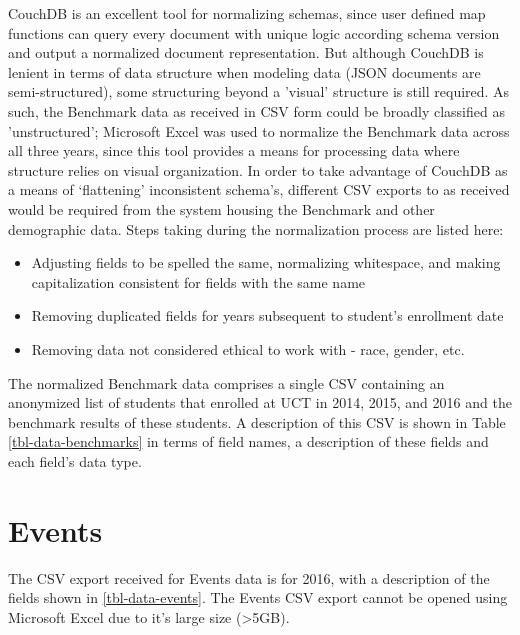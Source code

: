 CouchDB is an excellent tool for normalizing schemas, since user defined map functions can query every document with unique logic according schema version and output a normalized document representation. But although CouchDB is lenient in terms of data structure when modeling data (JSON documents are semi-structured), some structuring beyond a 'visual' structure is still required. As such, the Benchmark data as received in CSV form could be broadly classified as 'unstructured'; Microsoft Excel was used to normalize the Benchmark data across all three years, since this tool provides a means for processing data where structure relies on visual organization. In order to take advantage of CouchDB as a means of `flattening' inconsistent schema's, different CSV exports to as received would be required from the system housing the Benchmark and other demographic data. Steps taking during the normalization process are listed here:

\begin{itemize}
    \item Adjusting fields to be spelled the same, normalizing whitespace, and making capitalization consistent for fields with the same name
    \item Removing duplicated fields for years subsequent to student's enrollment date
    \item Removing data not considered ethical to work with - race, gender, etc.
\end{itemize}

The normalized Benchmark data comprises a single CSV containing an anonymized list of students that enrolled at UCT in 2014, 2015, and 2016 and the benchmark results of these students. A description of this CSV is shown in Table \ref{tbl-data-benchmarks} in terms of field names, a description of these fields and each field's data type.

\section{Events}
The CSV export received for Events data is for 2016, with a description of the fields shown in \ref{tbl-data-events}. The Events CSV export cannot be opened using Microsoft Excel due to it's large size (\textgreater 5GB).

\newpage


\newpage


